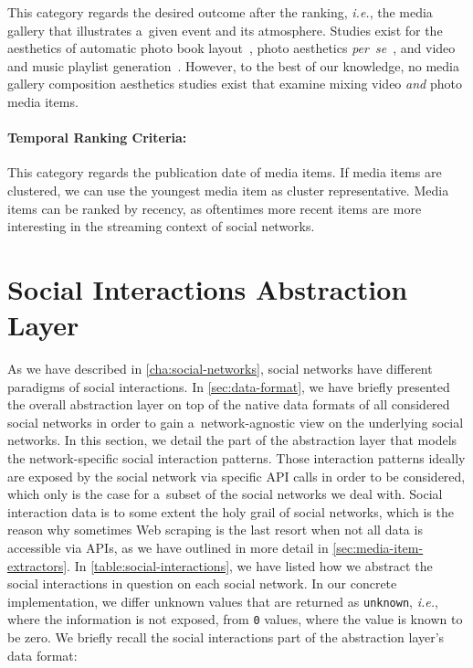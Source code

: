 This category regards the desired outcome after the ranking, \emph{i.e.},
the media gallery that illustrates a~given event and its atmosphere.
Studies exist for the aesthetics of
automatic photo book layout~\cite{sandhaus2011photobook},
photo aesthetics \emph{per~se}~\cite{obrador2012photoaesthetics},
and video and music playlist generation~\cite{knees2006musicplaylist,davidson2010videorecommendation}.
However, to the best of our knowledge,
no media gallery composition aesthetics studies exist
that examine mixing video \emph{and} photo media items.

\paragraph{Temporal Ranking Criteria:}

This category regards the publication date of media items.
If media items are clustered, we can use the youngest media item
as cluster representative.
Media items can be ranked by recency, as oftentimes more recent items
are more interesting in the streaming context of social networks.

\section{Social Interactions Abstraction Layer}
\label{sec:social-interactions-abstraction-layer}

As we have described in \autoref{cha:social-networks},
social networks have different paradigms of social interactions.
In \autoref{sec:data-format}, we have briefly presented the overall
abstraction layer on top of the native data formats
of all considered social networks in order to gain
a~network-agnostic view on the underlying social networks.
In this section, we detail the part of the abstraction layer
that models the network-specific social interaction patterns.
Those interaction patterns ideally are exposed by the social network 
via specific API calls in order to be considered,
which only is the case for a~subset of the social networks we deal with.
Social interaction data is to some extent the holy grail of social networks,
which is the reason why sometimes Web scraping is the last resort
when not all data is accessible via APIs,
as we have outlined in more detail in \autoref{sec:media-item-extractors}.
In \autoref{table:social-interactions}, we have listed
how we abstract the social interactions in question on each social network.
In our concrete implementation, we differ unknown values
that are returned as \texttt{unknown}, \emph{i.e.},
where the information is not exposed,
from \texttt{0} values, where the value is known to be zero.
We briefly recall the social interactions part
of the abstraction layer's data format:


